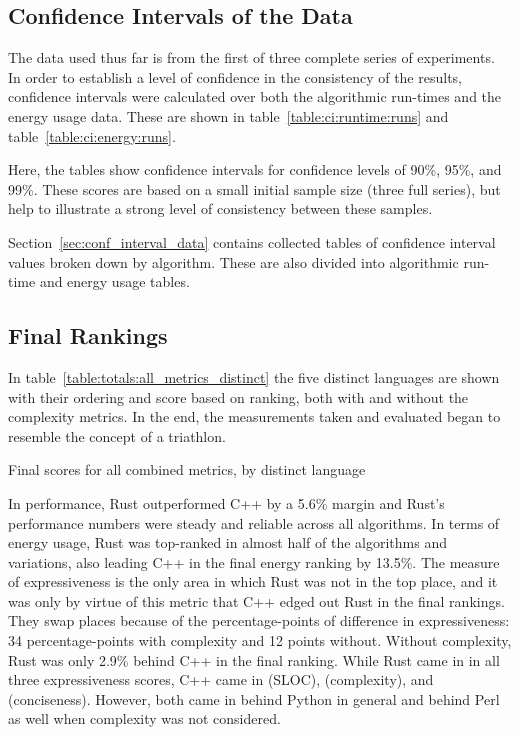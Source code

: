 \subsection{Confidence Intervals of the Data}
\label{subsec:confidence-intervals}

The data used thus far is from the first of three complete series of experiments. In order to establish a level of confidence in the consistency of the results, confidence intervals were calculated over both the algorithmic run-times and the energy usage data. These are shown in table~\ref{table:ci:runtime:runs} and table~\ref{table:ci:energy:runs}.





Here, the tables show confidence intervals for confidence levels of 90\%, 95\%, and 99\%. These scores are based on a small initial sample size (three full series), but help to illustrate a strong level of consistency between these samples.

Section~\ref{sec:conf_interval_data} contains collected tables of confidence interval values broken down by algorithm. These are also divided into algorithmic run-time and energy usage tables.

\subsection{Final Rankings}
\label{subsec:final-rankings}

In table~\ref{table:totals:all_metrics_distinct} the five distinct languages are shown with their ordering and score based on ranking, both with and without the complexity metrics. In the end, the measurements taken and evaluated began to resemble the concept of a triathlon.

\begin{table}[!htb]

\caption{Final scores for all combined metrics, by distinct language}
\label{table:totals:all_metrics_distinct}
\end{table}

In performance, Rust outperformed C++ by a 5.6\% margin and Rust's performance numbers were steady and reliable across all algorithms. In terms of energy usage, Rust was top-ranked in almost half of the algorithms and variations, also leading C++ in the final energy ranking by 13.5\%. The measure of expressiveness is the only area in which Rust was not in the top place, and it was only by virtue of this metric that C++ edged out Rust in the final rankings. They swap places because of the percentage-points of difference in expressiveness: 34 percentage-points with complexity and 12 points without. Without complexity, Rust was only 2.9\% behind C++ in the final ranking. While Rust came in  in all three expressiveness scores, C++ came in  (SLOC),  (complexity), and  (conciseness). However, both came in behind Python in general and behind Perl as well when complexity was not considered.

